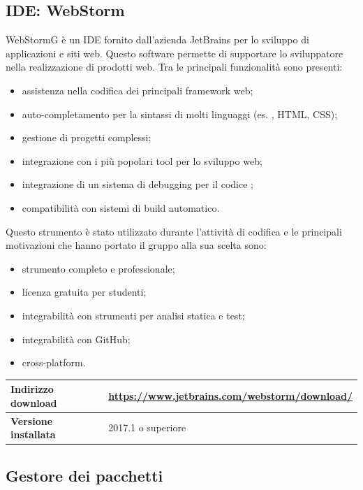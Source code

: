 	\subsection{IDE: WebStorm}
	WebStormG è un IDE fornito dall'azienda JetBrains per lo sviluppo di applicazioni e siti web. Questo software permette di supportare lo sviluppatore nella realizzazione di prodotti web. Tra le principali funzionalità sono presenti:
	\begin{itemize}
		\item assistenza nella codifica dei principali framework web;
		\item auto-completamento per la sintassi di molti linguaggi (es. \js, HTML, CSS);
		\item gestione di progetti complessi;
		\item integrazione con i più popolari tool per lo sviluppo web;
		\item integrazione di un sistema di debugging per il codice \js;
		\item compatibilità con sistemi di build automatico.
	\end{itemize}
	Questo strumento è stato utilizzato durante l'attività di codifica e le principali motivazioni che hanno portato il gruppo alla sua scelta sono:
	\begin{itemize}
		\item strumento completo e professionale;
		\item licenza gratuita per studenti;
		\item integrabilità con strumenti per analisi statica e test;
		\item integrabilità con GitHub;
		\item cross-platform.
	\end{itemize}
	\begin{table}[H]
		\centering
		\begin{tabular}{p{2cm}p{0.5cm}p{11.5cm}}
			\arrayrulecolor{lightgray}
			\toprule
			\textbf{Indirizzo download} & &
			\url{https://www.jetbrains.com/webstorm/download/}
			\\ \midrule
			\textbf{Versione installata} & &
			2017.1 o superiore
			\\ \bottomrule
		\end{tabular}
	\end{table}
	\subsection{Gestore dei pacchetti}
